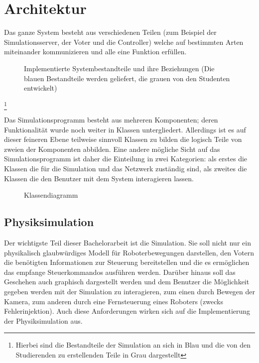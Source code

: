 \section{Architektur}
Das ganze System besteht aus verschiedenen Teilen (zum Beispiel der Simulationsserver, der Voter und die Controller) welche
auf bestimmten Arten miteinander kommunizieren und alle eine Funktion erf{\"{u}}llen.

\begin{figure}
	\centering
	\caption[Implementierte Systembestandteile]{Implementierte Systembestandteile und ihre Beziehungen (Die blauen Bestandteile werden geliefert, die grauen von den Studenten entwickelt)}
	\label{fig:arch}
\end{figure}
\footnote{Hierbei sind die Bestandteile der Simulation an sich in Blau und die von den Studierenden zu erstellenden Teile in Grau
dargestellt}


Das Simulationsprogramm besteht aus mehreren Komponenten; deren Funktionalit{\"{a}}t wurde noch weiter in Klassen untergliedert. Allerdings
ist es auf dieser feineren Ebene teilweise sinnvoll Klassen zu bilden die logisch Teile von zweien der Komponenten abbilden. Eine andere
m{\"{o}}gliche Sicht auf das Simulationsprogramm ist daher die Einteilung in zwei Kategorien: als erstes die Klassen die f{\"{u}}r die
Simulation und das Netzwerk zust{\"{a}}ndig sind, als zweites die Klassen die den Benutzer mit dem System interagieren lassen.
\begin{figure}
	\centering
	\caption{Klassendiagramm}
	\label{fig:uml}
\end{figure}

\subsection{Physiksimulation}
Der wichtigste Teil dieser Bachelorarbeit ist die Simulation. Sie soll nicht nur ein physikalisch glaubw{\"{u}}rdiges Modell
f{\"{u}}r Roboterbewegungen darstellen, den Votern die ben{\"{o}}tigten Informationen zur Steuerung bereitstellen und die
es erm{\"{o}}glichen das empfange Steuerkommandos ausf{\"{u}}hren werden. Dar{\"{u}}ber hinaus soll das Geschehen auch graphisch
dargestellt werden und dem Benutzer die M{\"{o}}glichkeit gegeben werden mit der Simulation zu interagieren, zum einen
durch Bewegen der Kamera, zum anderen durch eine Fernsteuerung eines Roboters (zwecks Fehlerinjektion). Auch diese
Anforderungen wirken sich auf die Implementierung der Physiksimulation aus. 

